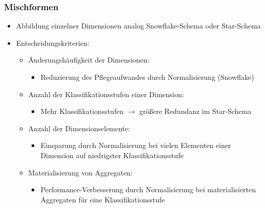             \begin{frame}
        
                \frametitle{Mischformen}
        
                \begin{itemize}
                \item Abbildung einzelner Dimensionen analog Snowflake-Schema oder
                  Star-Schema
                \item Entscheidungskriterien:
                  \begin{itemize}
                  \item Änderungshäufigkeit der Dimensionen:
                    \begin{itemize}
                    \item Reduzierung des Pflegeaufwandes durch Normalisierung
                      (Snowflake)
                    \end{itemize}
                  \item Anzahl der Klassifikationsstufen einer Dimension:
                    \begin{itemize}
                    \item Mehr Klassifikationsstufen $\to$ größere Redundanz im
                      Star-Schema
                    \end{itemize}
        
                  \item Anzahl der Dimensionselemente:
                    \begin{itemize}
                    \item Einsparung durch Normalisierung bei vielen Elementen einer
                      Dimension auf niedrigster Klassifikationsstufe
                    \end{itemize}
                  \item Materialisierung von Aggregaten:
                    \begin{itemize}
                    \item Performance-Verbesserung durch Normalisierung bei
                      materialisierten Aggregaten für eine Klassifikationsstufe
                    \end{itemize}
                  \end{itemize}
                \end{itemize}
        
                \end{frame}
        
